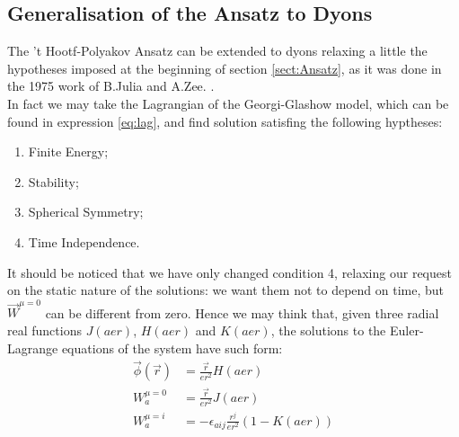 \subsection{Generalisation of the Ansatz to Dyons}
The 't Hootf-Polyakov Ansatz can be extended to dyons relaxing a little the hypotheses imposed at the beginning of section \ref{sect:Ansatz}, as it was done in the 1975 work of B.Julia and A.Zee. \cite{Julia:Dyon}.\\
\medskip 
In fact we may take the Lagrangian of the Georgi-Glashow model, which can be found in expression \ref{eq:lag}, and find solution satisfing the following hyptheses:
 \begin{enumerate}
     \item Finite Energy; 
     \item Stability; 
     \item Spherical Symmetry;
     \item Time Independence.
 \end{enumerate}
 It should be noticed that we have only changed condition 4, relaxing our request on the static nature of the solutions: we want them not to depend on time, but $\vec{W}^{\mu=0}$ can be different from zero. Hence we may think that, given three radial real functions $J(aer)$, $H(aer)$ and $K(aer)$, the solutions to the Euler-Lagrange equations of the system have such form:
   \begin{align}
      \vec{\phi}(\vec{r}) &= \frac{\vec{r}}{er^2}H(aer) \\ 
      W^{\mu=0}_{a}&= \frac{\vec{r}}{er^2}J(aer) \\  
      W^{\mu =i}_{a} &= - \epsilon_{aij}\frac{r^j}{er^2}(1 - K(aer)) 
  \end{align}
  
